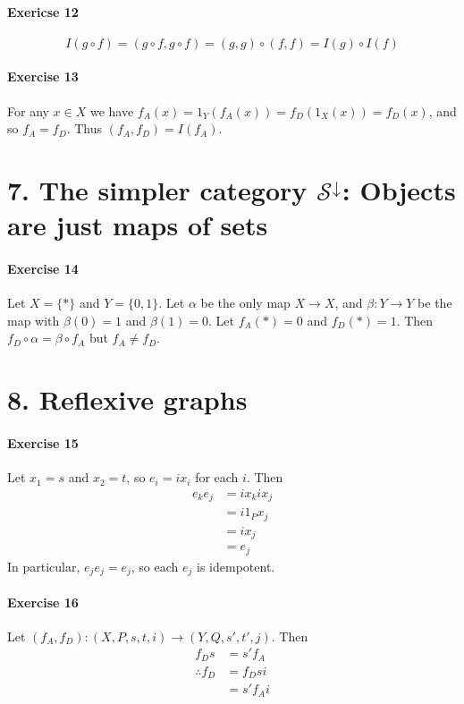 \documentclass{report}
\begin{document}
    \paragraph{Exericse 12}
    \[ I(g \circ f) = (g \circ f, g \circ f) = (g,g) \circ (f,f) = I(g) \circ I(f) \]

    \paragraph{Exercise 13}
    For any $x \in X$ we have $f_A(x) = 1_Y(f_A(x)) = f_D(1_X(x)) = f_D(x)$, and so $f_A = f_D$.
    Thus $(f_A, f_D) = I(f_A)$.

    \section{7. The simpler category $\mathcal{S}^\downarrow$: Objects are just maps of sets}

    \paragraph{Exercise 14}
    Let $X = \{ * \}$ and $Y = \{ 0, 1 \}$. Let $\alpha$ be the only map $X \rightarrow X$, and
    $\beta : Y \rightarrow Y$ be the map with $\beta(0) = 1$ and $\beta(1) = 0$. Let $f_A(*) = 0$
    and $f_D(*) = 1$. Then $f_D \circ \alpha = \beta \circ f_A$ but $f_A \neq f_D$.

    \section{8. Reflexive graphs}

    \paragraph{Exercise 15}
    Let $x_1 = s$ and $x_2 = t$, so $e_i = i x_i$ for each $i$. Then
    \begin{align*}
        e_k e_j & = i x_k i x_j \\
        & = i 1_P x_j \\
        & = i x_j \\
        & = e_j
    \end{align*}
    In particular, $e_j e_j = e_j$, so each $e_j$ is idempotent.

    \paragraph{Exercise 16}
    Let $(f_A, f_D) : (X, P, s, t, i) \rightarrow (Y, Q, s', t', j)$. Then
    \begin{align*}
        f_D s & = s' f_A \\
        \therefore f_D & = f_D s i \\
        & = s' f_A i
    \end{align*}
\end{document}
